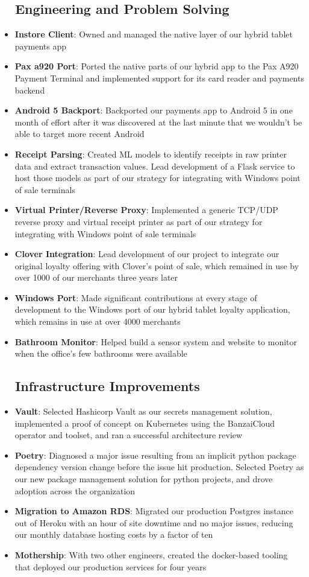 \documentclass[a4paper,20pt]{article}
\newcommand{\resumeItem}[2]{
  \item\small{
    \textbf{#1}{: #2 \vspace{-2pt}}
  }
}
\newcommand{\resumeItemListStart}{\begin{itemize}}
\newcommand{\resumeItemListEnd}{\end{itemize}\vspace{-5pt}}
\begin{document}
    \subsection{~~Engineering and Problem Solving}
      \resumeItemListStart
        \resumeItem{Instore Client}{Owned and managed the native layer of our hybrid tablet payments app}
        \resumeItem{Pax a920 Port}{Ported the native parts of our hybrid app to the Pax A920 Payment Terminal and implemented support for its card reader and payments backend}
        \resumeItem{Android 5 Backport}{Backported our payments app to Android 5 in one month of effort after it was discovered at the last minute that we wouldn't be able to target more recent Android}
        \resumeItem{Receipt Parsing}{Created ML models to identify receipts in raw printer data and extract transaction values.  Lead development of a Flask service to host those models as part of our strategy for integrating with Windows point of sale terminals}
        \resumeItem{Virtual Printer/Reverse Proxy}{Implemented a generic TCP/UDP reverse proxy and virtual receipt printer as part of our strategy for integrating with Windows point of sale terminals}
        \resumeItem{Clover Integration}{Lead development of our project to integrate our original loyalty offering with Clover's point of sale, which remained in use by over 1000 of our merchants three years later}
        \resumeItem{Windows Port}{Made significant contributions at every stage of development to the Windows port of our hybrid tablet loyalty application, which remains in use at over 4000 merchants}
        \resumeItem{Bathroom Monitor}{Helped build a sensor system and website to monitor when the office's few bathrooms were available}
      \resumeItemListEnd

    \subsection{~~Infrastructure Improvements}
      \resumeItemListStart
        \resumeItem{Vault}{Selected Hashicorp Vault as our secrets management solution, implemented a proof of concept on Kubernetes using the BanzaiCloud operator and toolset, and ran a successful architecture review}
        \resumeItem{Poetry}{Diagnosed a major issue resulting from an implicit python package dependency version change before the issue hit production.  Selected Poetry as our new package management solution for python projects, and drove adoption across the organization}
        \resumeItem{Migration to Amazon RDS}{Migrated our production Postgres instance out of Heroku with an hour of site downtime and no major issues, reducing our monthly database hosting costs by a factor of ten}
        \resumeItem{Mothership}{With two other engineers, created the docker-based tooling that deployed our production services for four years}
      \resumeItemListEnd
\end{document}
